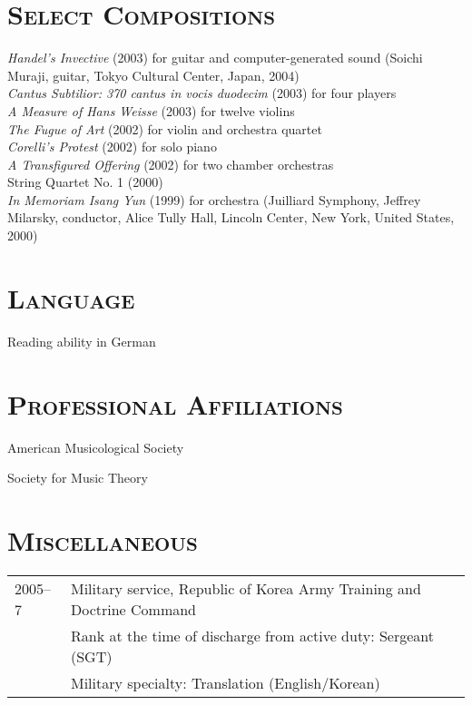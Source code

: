 \documentclass[letter,11pt,draft]{article}
\begin{document}
  \vspace{2.5mm}
  
  \section*{\textsc{Select Compositions}}
  
  \begin{hangparas}{15pt}{1}
    \textit{Handel’s Invective} (2003) for guitar and computer-generated sound (Soichi Muraji, guitar, Tokyo Cultural Center, Japan, 2004)\\[2mm]
  
    \textit{Cantus Subtilior: 370 cantus in vocis duodecim} (2003) for four players\\[2mm]
  
    \textit{A Measure of Hans Weisse} (2003) for twelve violins\\[2mm]
  
    \textit{The Fugue of Art} (2002) for violin and orchestra quartet\\[2mm]
  
    \textit{Corelli’s Protest} (2002) for solo piano\\[2mm]
  
    \textit{A Transfigured Offering} (2002) for two chamber orchestras\\[2mm]
  
    String Quartet No. 1 (2000)\\[2mm]
  
    \textit{In Memoriam Isang Yun} (1999) for orchestra (Juilliard Symphony, Jeffrey Milarsky, conductor, Alice Tully Hall, Lincoln Center, New York, United States, 2000)
  \end{hangparas}
  
  \vspace{5mm}
  
  \section*{\textsc{Language}}
  
  Reading ability in German
  
  \section*{\textsc{Professional Affiliations}}
  
  American Musicological Society
  
  \noindent Society for Music Theory
  
  \section*{\textsc{Miscellaneous}}
  
  \hspace*{-0.25cm}
  \begin{tabular}{p{2.5cm} l}
    2005–7 & Military service, Republic of Korea Army Training and Doctrine Command\\
    & Rank at the time of discharge from active duty: Sergeant (SGT)\\
    & Military specialty: Translation (English/Korean)
  \end{tabular}
\end{document}
